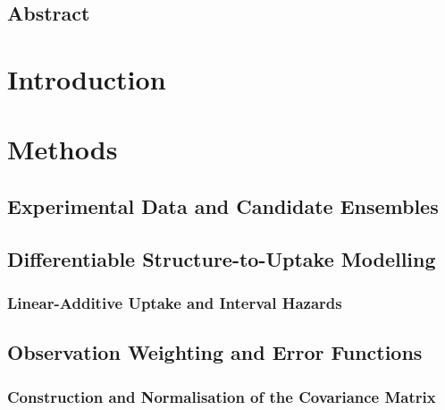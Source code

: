 \subsection{Abstract}
\label{sec:jaxent-abstract}

\section{Introduction}
\label{sec:jaxent-intro}

\section{Methods}
\label{sec:jaxent-methods}

\subsection{Experimental Data and Candidate Ensembles}
\label{sec:jaxent-inputs}

\subsection{Differentiable Structure-to-Uptake Modelling}
\label{sec:jaxent-forward}

\subsubsection{Linear-Additive Uptake and Interval Hazards}
\label{sec:jaxent-linear-uptake}

\subsection{Observation Weighting and Error Functions}
\label{sec:jaxent-loss}

\subsubsection{Construction and Normalisation of the Covariance Matrix}
\label{sec:jaxent-covariance}


